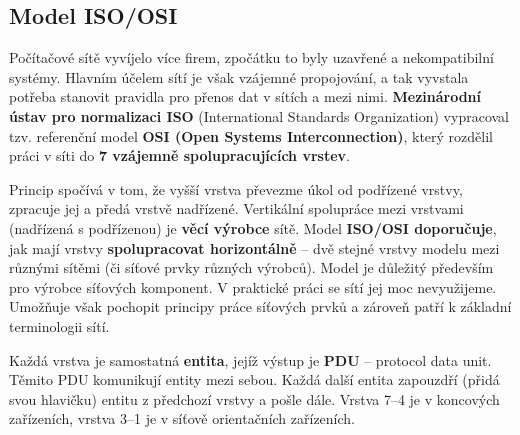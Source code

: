 \subsection{Model ISO/OSI}
Počítačové sítě vyvíjelo více firem, zpočátku to byly uzavřené a nekompatibilní systémy. Hlavním účelem sítí je však vzájemné propojování, a tak vyvstala potřeba stanovit pravidla pro přenos dat v sítích a mezi nimi. \textbf{Mezinárodní ústav pro normalizaci ISO} (International Standards Organization) vypracoval tzv. referenční model \textbf{OSI (Open Systems Interconnection)}, který rozdělil práci v síti do \textbf{7 vzájemně spolupracujících vrstev}.

Princip spočívá v tom, že vyšší vrstva převezme úkol od podřízené vrstvy, zpracuje jej a předá vrstvě nadřízené. Vertikální spolupráce mezi vrstvami (nadřízená s podřízenou) je \textbf{věcí výrobce} sítě. Model \textbf{ISO/OSI doporučuje}, jak mají vrstvy \textbf{spolupracovat horizontálně} – dvě stejné vrstvy modelu mezi různými sítěmi (či síťové prvky různých výrobců). Model je důležitý především pro výrobce síťových komponent. V praktické práci se sítí jej moc nevyužijeme. Umožňuje však pochopit principy práce síťových prvků a zároveň patří k základní terminologii sítí.

Každá vrstva je samostatná \textbf{entita}, jejíž výstup je \textbf{PDU} -- protocol data unit. Těmito PDU komunikují entity mezi sebou. Každá další entita zapouzdří (přidá svou hlavičku) entitu z předchozí vrstvy a pošle dále. Vrstva 7--4 je v koncových zařízeních, vrstva 3--1 je v síťově orientačních zařízeních.

